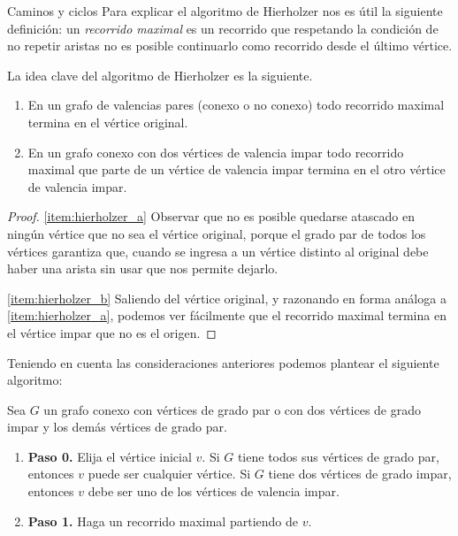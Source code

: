 \begin{section}{Caminos y ciclos}
Para explicar el algoritmo de Hierholzer nos es útil la siguiente definición:  un \textit{recorrido maximal}  es un recorrido que respetando la condición de no repetir aristas no es posible continuarlo como recorrido desde el último vértice.  

La idea clave del algoritmo de Hierholzer  es la siguiente.

\begin{lema}\label{lema:hierholzer}
    \begin{enumerate}
        \item\label{item:hierholzer_a} En un grafo de valencias pares (conexo o no conexo) todo recorrido maximal termina en el vértice original.
        \item\label{item:hierholzer_b} En  un grafo conexo con dos vértices de valencia impar todo recorrido maximal que parte de un vértice de valencia impar termina en el otro vértice de valencia impar.
    \end{enumerate}
\end{lema}
\begin{proof} \ref{item:hierholzer_a}
    Observar que no es posible quedarse atascado en ningún vértice que no sea  el vértice original, porque el grado par de todos los vértices garantiza que, cuando se ingresa a un vértice distinto al original debe haber una  arista sin usar que nos permite dejarlo. 

    \ref{item:hierholzer_b} Saliendo del vértice original, y razonando en forma análoga a  \ref{item:hierholzer_a}, podemos ver fácilmente que el recorrido maximal termina en el vértice impar que no es el origen. 
\end{proof}


Teniendo en cuenta las consideraciones anteriores podemos plantear el siguiente algoritmo:

Sea $G$ un grafo conexo con vértices de grado par o con dos vértices de grado impar y los demás vértices de grado par. 

\begin{enumerate}
    \item \textbf{Paso 0.} Elija el vértice inicial $v$. Si $G$  tiene todos sus vértices de grado par,  entonces $v$ puede ser cualquier vértice. Si $G$ tiene dos vértices de grado impar,  entonces $v$ debe ser uno de los vértices de valencia impar.
    \item \textbf{Paso 1.} Haga un recorrido maximal partiendo de $v$. 
    

\end{enumerate}
\end{section}
